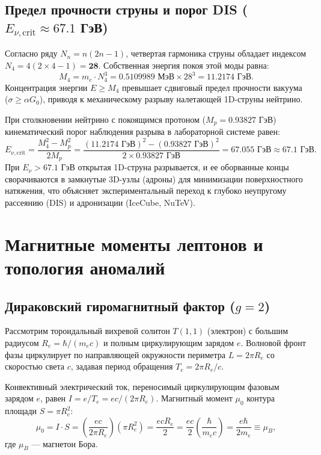 \documentclass[12pt,a4paper]{article}
\begin{document}
	\subsection{Предел прочности струны и порог DIS ($E_{\nu, \text{crit}} \approx 67.1$ ГэВ)}
	Согласно ряду $N_n = n(2n-1)$, четвертая гармоника струны обладает индексом $N_4 = 4(2 \times 4 - 1) = \mathbf{28}$. Собственная энергия покоя этой моды равна:
	\begin{equation}
		M_4 = m_e \cdot N_4^3 = 0.5109989 \text{ МэВ} \times 28^3 = \mathbf{11.2174 \text{ ГэВ}}.
	\end{equation}
	Концентрация энергии $E \ge M_4$ превышает сдвиговый предел прочности вакуума ($\sigma \ge \alpha G_0$), приводя к механическому разрыву налетающей 1D-струны нейтрино. 
	
	При столкновении нейтрино с покоящимся протоном ($M_p = 0.93827$ ГэВ) кинематический порог наблюдения разрыва в лабораторной системе равен:
	\begin{equation}
		E_{\nu, \text{crit}} = \frac{M_4^2 - M_p^2}{2 M_p} = \frac{(11.2174 \text{ ГэВ})^2 - (0.93827 \text{ ГэВ})^2}{2 \times 0.93827 \text{ ГэВ}} = \mathbf{67.055 \text{ ГэВ}} \approx \mathbf{67.1 \text{ ГэВ}}.
	\end{equation}
	При $E_\nu > 67.1$ ГэВ открытая 1D-струна разрывается, и ее оборванные концы сворачиваются в замкнутые 3D-узлы (адроны) для минимизации поверхностного натяжения, что объясняет экспериментальный переход к глубоко неупругому рассеянию (DIS) и адронизации (IceCube, NuTeV).
	
	\section{Магнитные моменты лептонов и топология аномалий}
	
	\subsection{Дираковский гиромагнитный фактор ($g=2$)}
	Рассмотрим тороидальный вихревой солитон $T(1,1)$ (электрон) с большим радиусом $R_e = \hbar / (m_e c)$ и полным циркулирующим зарядом $e$. Волновой фронт фазы циркулирует по направляющей окружности периметра $L = 2\pi R_e$ со скоростью света $c$, задавая период обращения $T_e = 2\pi R_e / c$.
	
	Конвективный электрический ток, переносимый циркулирующим фазовым зарядом $e$, равен $I = e / T_e = e c / (2\pi R_e)$. Магнитный момент $\mu_0$ контура площади $S = \pi R_e^2$:
	\begin{equation}
		\mu_0 = I \cdot S = \left( \frac{e c}{2\pi R_e} \right) \left( \pi R_e^2 \right) = \frac{e c R_e}{2} = \frac{e c}{2} \left( \frac{\hbar}{m_e c} \right) = \frac{e \hbar}{2 m_e} \equiv \mu_B,
	\end{equation}
	где $\mu_B$ --- магнетон Бора.
	
\end{document}
